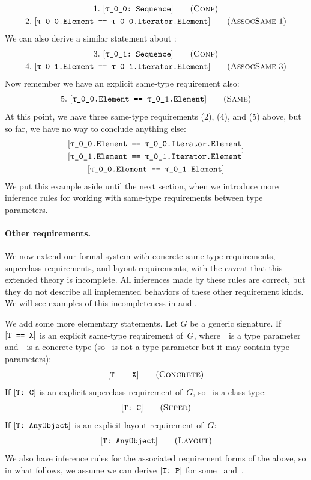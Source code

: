 \documentclass[../generics]{subfiles}
\begin{document}
\begin{example}
\begin{gather*}
\ConfStep{\rT}{Sequence}{1}\\
\AssocSameStep{1}{\rT.Element}{\rT.Iterator.Element}{2}
\end{gather*}
We can also derive a similar statement about \rU:
\begin{gather*}
\ConfStep{\rU}{Sequence}{3}\\
\AssocSameStep{3}{\rU.Element}{\rU.Iterator.Element}{4}
\end{gather*}
Now remember we have an explicit same-type requirement also:
\begin{gather*}
\SameStep{\rT.Element}{\rU.Element}{5}
\end{gather*}
At this point, we have three same-type requirements (2), (4), and (5) above, but so far, we have no way to conclude anything else:
\begin{gather*}
\SameReq{\rT.Element}{\rT.Iterator.Element}\\
\SameReq{\rU.Element}{\rU.Iterator.Element}\\
\SameReq{\rT.Element}{\rU.Element}
\end{gather*}
We put this example aside until the next section, when we introduce more inference rules for working with same-type requirements between type parameters.
\end{example}

\paragraph{Other requirements.}
We now extend our formal system with concrete same-type requirements, superclass requirements, and layout requirements, with the caveat that this extended theory is incomplete. All inferences made by these rules are correct, but they do not describe all implemented behaviors of these other requirement kinds. We will see examples of this incompleteness in  and .

We add some more elementary statements. Let $G$ be a generic signature. If $[\texttt{T == X}]$ is an explicit same-type requirement of~$G$, where~\tT\ is a type parameter and~\tX\ is a concrete type (so \tX\ is not a type parameter but it may contain type parameters):
\begin{gather*}
\ConcreteStepDef
\end{gather*}
If $[\texttt{T:~C}]$ is an explicit superclass requirement of~$G$, so \tC\ is a class type:
\begin{gather*}
\SuperStepDef
\end{gather*}
If $[\texttt{T:~AnyObject}]$ is an explicit layout requirement of~$G$:
\begin{gather*}
\LayoutStepDef
\end{gather*}
We also have inference rules for the associated requirement forms of the above, so in what follows, we assume we can derive $[\texttt{T:~P}]$ for some \tT~and~\tP.
\end{document}
